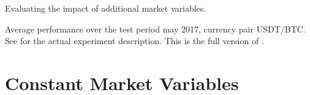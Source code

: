\begin{table}[ht]
        		\caption[Full version of ]{Evaluating the impact of additional market variables.}
		\small Average performance over the test period may 2017, currency pair USDT/BTC.\\		
		See  for the actual experiment description. This is the full version of .
		\label{tab:eval:additionalMarketVariables:fulltable}

\end{table}
\clearpage{}



\section{Constant Market Variables}
\label{appendix:fixedMarketVars}
